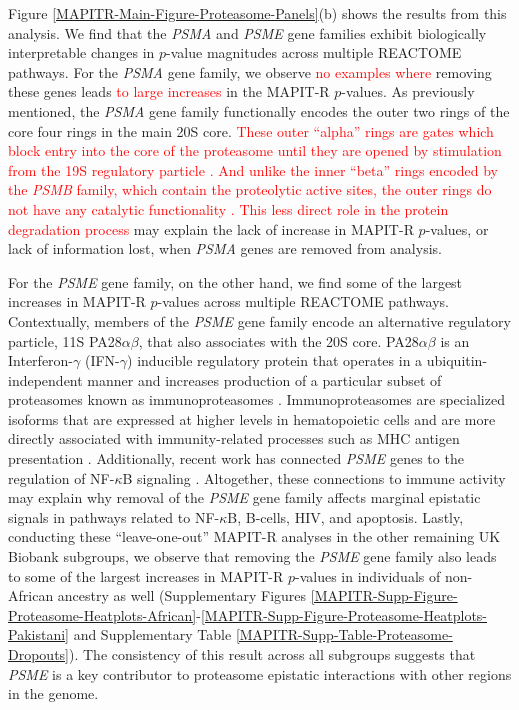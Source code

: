 \documentclass[10pt]{article}
\begin{document}
Figure \ref{MAPITR-Main-Figure-Proteasome-Panels}(b) shows the results from this analysis. We find that the \textit{PSMA} and \textit{PSME} gene families exhibit biologically interpretable changes in $p$-value magnitudes across multiple REACTOME pathways. For the \textit{PSMA} gene family, we observe \textcolor{red}{no examples where} removing these genes leads \textcolor{red}{to large increases} in the MAPIT-R $p$-values. As previously mentioned, the \textit{PSMA} gene family functionally encodes the outer two rings of the core four rings in the main 20S core. \textcolor{red}{These outer ``alpha'' rings are gates which block entry into the core of the proteasome until they are opened by stimulation from the 19S regulatory particle \cite{Groll2000,Kohler2001,Smith2007}. And unlike the inner ``beta'' rings encoded by the \textit{PSMB} family, which contain the proteolytic active sites, the outer rings do not have any catalytic functionality \cite{Baumeister1998,Groll1999}. This less direct role in the protein degradation process} may explain the lack of increase in MAPIT-R $p$-values, or lack of information lost, when \textit{PSMA} genes are removed from analysis. 
 
For the \textit{PSME} gene family, on the other hand, we find some of the largest increases in MAPIT-R $p$-values across multiple REACTOME pathways. Contextually, members of the \textit{PSME} gene family encode an alternative regulatory particle, 11S PA28$\alpha\beta$, that also associates with the 20S core. PA28$\alpha\beta$ is an Interferon-$\gamma$ (IFN-$\gamma$) inducible regulatory protein that operates in a ubiquitin-independent manner and increases production of a particular subset of proteasomes known as immunoproteasomes \cite{Groettrup1996,de2011,Raule2014,Murata2018}. Immunoproteasomes are specialized isoforms that are expressed at higher levels in hematopoietic cells and are more directly associated with immunity-related processes such as MHC antigen presentation \cite{Ferrington2012,Basler2013,McCarthy2015}. Additionally, recent work has connected \textit{PSME} genes to the regulation of NF-$\kappa$B signaling \cite{Sun2016,Mitchell2019}. Altogether, these connections to immune activity may explain why removal of the \textit{PSME} gene family affects marginal epistatic signals in pathways related to NF-$\kappa$B, B-cells, HIV, and apoptosis. Lastly, conducting these ``leave-one-out'' MAPIT-R analyses in the other remaining UK Biobank subgroups, we observe that removing the \textit{PSME} gene family also leads to some of the largest increases in MAPIT-R $p$-values in individuals of non-African ancestry as well (Supplementary Figures \ref{MAPITR-Supp-Figure-Proteasome-Heatplots-African}-\ref{MAPITR-Supp-Figure-Proteasome-Heatplots-Pakistani} and Supplementary Table \ref{MAPITR-Supp-Table-Proteasome-Dropouts}). The consistency of this result across all subgroups suggests that \textit{PSME} is a key contributor to proteasome epistatic interactions with other regions in the genome. 
\end{document}
